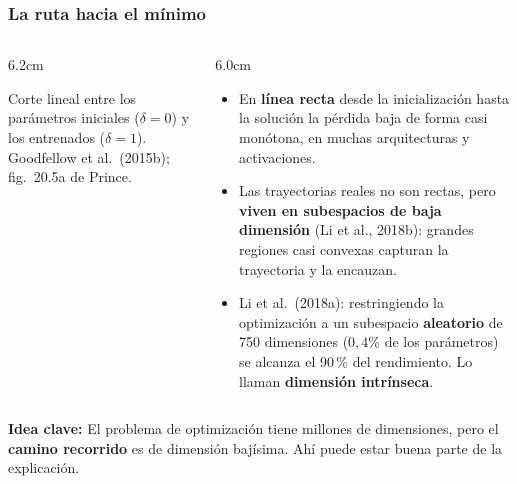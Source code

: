 \documentclass[aspectratio=169, 10pt]{beamer}
\newcommand{\idea}[1]{%
	\begin{tcolorbox}[colback=AccentGreen!6, colframe=AccentGreen, arc=3pt,
		width=\textwidth, boxsep=1pt, left=5pt, right=5pt, top=2pt, bottom=2pt,
		fontupper=\small]
		\RaggedRight\textbf{Idea clave:} #1
	\end{tcolorbox}
}
\newcommand{\fuente}[1]{{\scriptsize\color{StanfordGray}#1}}
\begin{document}
\begin{frame}
\frametitle{La ruta hacia el mínimo}
\footnotesize %
\begin{columns}[c]
\begin{column}{6.2cm}
\begin{center}
\end{center}
\vspace{-0.4em}
\fuente{Corte lineal entre los par\'ametros iniciales ($\delta{=}0$) y los entrenados ($\delta{=}1$). Goodfellow et al.\ (2015b); fig.~20.5a de Prince.}
\end{column}
\begin{column}{6.0cm}
\begin{itemize}
	\item En \textbf{l\'inea recta} desde la inicializaci\'on hasta la soluci\'on la p\'erdida baja de forma casi mon\'otona, en muchas arquitecturas y activaciones.
	\item Las trayectorias reales no son rectas, pero \textbf{viven en subespacios de baja dimensi\'on} (Li et al., 2018b): grandes regiones casi convexas capturan la trayectoria y la encauzan.
	\item Li et al.\ (2018a): restringiendo la optimizaci\'on a un subespacio \textbf{aleatorio} de 750 dimensiones ($0{,}4\%$ de los par\'ametros) se alcanza el 90\,\% del rendimiento. Lo llaman \textbf{dimensi\'on intr\'inseca}.
\end{itemize}
\end{column}
\end{columns}
\vspace{0.2em}
\idea{El problema de optimizaci\'on tiene millones de dimensiones, pero el \textbf{camino recorrido} es de dimensi\'on baj\'isima. Ah\'i puede estar buena parte de la explicaci\'on.}
\end{frame}
\end{document}
